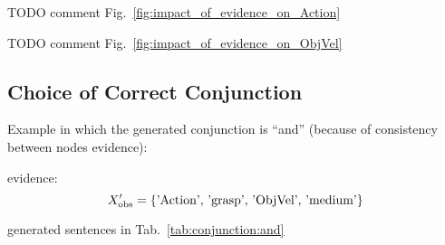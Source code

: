 TODO comment Fig.~\ref{fig:impact_of_evidence_on_Action}


\begin{figure*}
\centering
{} \quad
%
\caption{Predictions about the object velocity of different objects, when given probabilistic soft evidence about the action.}
\label{fig:impact_of_evidence_on_ObjVel}
\end{figure*}

TODO comment Fig.~\ref{fig:impact_of_evidence_on_ObjVel}

\subsection{Choice of Correct Conjunction}

\newcommand{\evidenceProducingAnd}{'Action', 'grasp', 'ObjVel', 'medium'}

Example in which the generated conjunction is ``and'' (because of consistency between nodes evidence):

evidence:
\begin{equation} \label{eq:evidence_producing_and}
    \xobs^\prime = \{ \text{\evidenceProducingAnd} \}
\end{equation}



generated sentences in Tab.~\ref{tab:conjunction:and}

